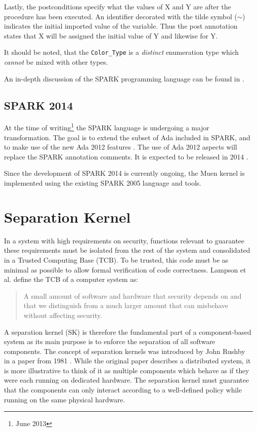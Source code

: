 Lastly, the postconditions specify what the values of X and Y are after the
procedure has been executed. An identifier decorated with the tilde symbol
($\sim$) indicates the initial imported value of the variable. Thus the post
annotation states that X will be assigned the initial value of Y and likewise
for Y.

It should be noted, that the \texttt{Color\_Type} is a \emph{distinct}
enumeration type which \emph{cannot} be mixed with other types.

An in-depth discussion of the SPARK programming language can be found in
\cite{BarnesSPARK}.

\subsection{SPARK 2014}
At the time of writing\footnote{June 2013} the SPARK language is undergoing a
major transformation. The goal is to extend the subset of Ada included in SPARK,
and to make use of the new Ada 2012 features \cite{Ada2012}. The use of Ada 2012
aspects will replace the SPARK annotation comments. It is expected to be
released in 2014 \cite{SPARK2014:Announcement}.

Since the development of SPARK 2014 is currently ongoing, the Muen kernel is
implemented using the existing SPARK 2005 language and tools.




\section{Separation Kernel}
In a system with high requirements on security, functions relevant
to guarantee these requirements must be isolated from the rest of
the system and consolidated in a Trusted Computing Base (TCB).
To be trusted, this code must be as minimal as possible to allow formal
verification of code correctness. Lampson et al.
\cite{Lampson:1991:ADS:121133.121160} define the TCB of a computer system as:
\begin{quote}
	A small amount of software and hardware that security depends on and
	that we distinguish from a much larger amount that can misbehave without
	affecting security.
\end{quote}

A separation kernel (SK) is therefore the fundamental
part of a component-based system as its main purpose is to enforce the
separation of all software components. The concept of separation kernels was
introduced by John Rushby in a paper from 1981 \cite{rushby1981}. While the
original paper describes a distributed system, it is more illustrative to think
of it as multiple components which behave as if they were each running on
dedicated hardware. The separation kernel must guarantee that the components
can only interact according to a well-defined policy while running on the same
physical hardware.

